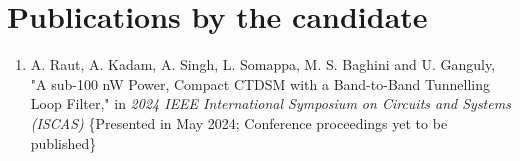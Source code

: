 \documentclass[12pt, a4paper
,openany
]{Thesis} %
\begin{document}
\label{References}


\makeatletter
{}     %

\renewcommand\bibname{References}



\clearpage
\section*{Publications by the candidate}
\begin{enumerate}
    \item A. Raut, A. Kadam, A. Singh, L. Somappa, M. S. Baghini and U. Ganguly, "A sub-100 nW Power, Compact CTDSM with a Band-to-Band Tunnelling Loop Filter," in \textit{2024 IEEE International Symposium on Circuits and Systems (ISCAS)} \{Presented in May 2024; Conference proceedings yet to be published\}
\end{enumerate}

\makeatother
% 
% 

\end{document}
